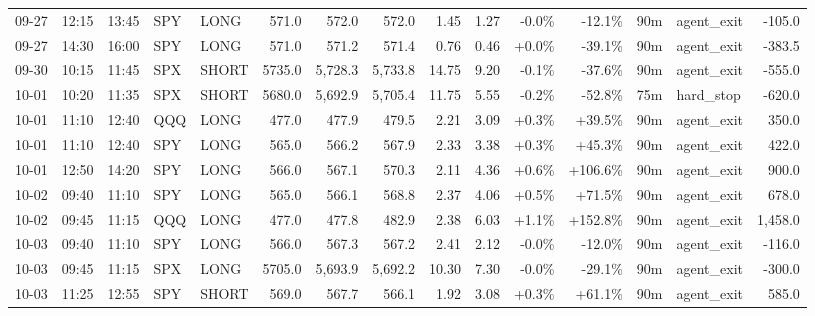 \documentclass[11pt,a4paper,twoside]{article}
\begin{document}
\begin{landscape}
\begin{center}
\begin{longtable}{>{\color{txtmain}}l l l l l r r r r r r r r >{\color{txtmain}}l r}
09-27 & 12:15 & 13:45 & SPY & LONG & 571.0 & 572.0 & 572.0 & 1.45 & 1.27 & \textcolor{lossred}{-0.0\%} & \textcolor{lossred}{-12.1\%} & 90m & agent\_exit & \textcolor{lossred}{-105.0} \\
09-27 & 14:30 & 16:00 & SPY & LONG & 571.0 & 571.2 & 571.4 & 0.76 & 0.46 & \textcolor{wingreen}{+0.0\%} & \textcolor{lossred}{-39.1\%} & 90m & agent\_exit & \textcolor{lossred}{-383.5} \\
09-30 & 10:15 & 11:45 & SPX & SHORT & 5735.0 & 5,728.3 & 5,733.8 & 14.75 & 9.20 & \textcolor{lossred}{-0.1\%} & \textcolor{lossred}{-37.6\%} & 90m & agent\_exit & \textcolor{lossred}{-555.0} \\
10-01 & 10:20 & 11:35 & SPX & SHORT & 5680.0 & 5,692.9 & 5,705.4 & 11.75 & 5.55 & \textcolor{lossred}{-0.2\%} & \textcolor{lossred}{-52.8\%} & 75m & hard\_stop & \textcolor{lossred}{-620.0} \\
10-01 & 11:10 & 12:40 & QQQ & LONG & 477.0 & 477.9 & 479.5 & 2.21 & 3.09 & \textcolor{wingreen}{+0.3\%} & \textcolor{wingreen}{+39.5\%} & 90m & agent\_exit & \textcolor{wingreen}{350.0} \\
10-01 & 11:10 & 12:40 & SPY & LONG & 565.0 & 566.2 & 567.9 & 2.33 & 3.38 & \textcolor{wingreen}{+0.3\%} & \textcolor{wingreen}{+45.3\%} & 90m & agent\_exit & \textcolor{wingreen}{422.0} \\
10-01 & 12:50 & 14:20 & SPY & LONG & 566.0 & 567.1 & 570.3 & 2.11 & 4.36 & \textcolor{wingreen}{+0.6\%} & \textcolor{wingreen}{+106.6\%} & 90m & agent\_exit & \textcolor{wingreen}{900.0} \\
10-02 & 09:40 & 11:10 & SPY & LONG & 565.0 & 566.1 & 568.8 & 2.37 & 4.06 & \textcolor{wingreen}{+0.5\%} & \textcolor{wingreen}{+71.5\%} & 90m & agent\_exit & \textcolor{wingreen}{678.0} \\
10-02 & 09:45 & 11:15 & QQQ & LONG & 477.0 & 477.8 & 482.9 & 2.38 & 6.03 & \textcolor{wingreen}{+1.1\%} & \textcolor{wingreen}{+152.8\%} & 90m & agent\_exit & \textcolor{wingreen}{1,458.0} \\
10-03 & 09:40 & 11:10 & SPY & LONG & 566.0 & 567.3 & 567.2 & 2.41 & 2.12 & \textcolor{lossred}{-0.0\%} & \textcolor{lossred}{-12.0\%} & 90m & agent\_exit & \textcolor{lossred}{-116.0} \\
10-03 & 09:45 & 11:15 & SPX & LONG & 5705.0 & 5,693.9 & 5,692.2 & 10.30 & 7.30 & \textcolor{lossred}{-0.0\%} & \textcolor{lossred}{-29.1\%} & 90m & agent\_exit & \textcolor{lossred}{-300.0} \\
10-03 & 11:25 & 12:55 & SPY & SHORT & 569.0 & 567.7 & 566.1 & 1.92 & 3.08 & \textcolor{wingreen}{+0.3\%} & \textcolor{wingreen}{+61.1\%} & 90m & agent\_exit & \textcolor{wingreen}{585.0} \\

\end{longtable}
\end{center}
\end{landscape}
\end{document}
